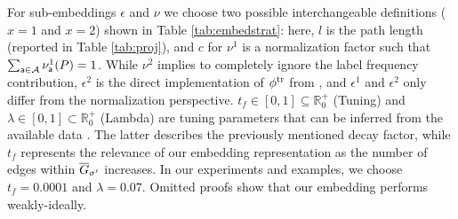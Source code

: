 {{%
\begin{table}[!t]
	\caption{Different sub-embedding definitions ($\epsilon^1$, $\epsilon^2$, $\nu^1$, and $\nu^2$) for $\gorgembed$.}\label{tab:embedstrat}
	\centering
\end{table}
%
For sub-embeddings $\epsilon$ and $\nu$  we choose two possible interchangeable definitions ($x=1$ and $x=2$) shown in Table \ref{tab:embedstrat}: here, $l$ is the path length (reported in Table \ref{tab:proj}), and $c$ for $\nu^1$ is a normalization factor such that $\sum_{\mathsf{a}\in\mathcal{A}}\nu^1_{\mathsf{a}}(P)=1$. While $\nu^2$ implies to completely ignore the label frequency contribution, $\epsilon^2$ is the direct implementation of ${\phi^{\text{tr}}}$ from \cite{LodhiSSCW02}, and $\epsilon^1$ and $\epsilon^2$ only differ from the normalization perspective. %
%
$t_f\in [0,1]\subseteq\mathbb{R}^+_{0}$ (\textsf{Tuning}) and $\lambda\in [0,1]\subset\mathbb{R}^+_{0}$ (\textsf{Lambda}) are tuning parameters that can be
inferred from the available data \cite{DriessensRG06}. The latter describes the previously mentioned decay factor, while $t_f$
represents the relevance of our embedding representation as the number of edges within $\overline{G}_{\sigma'}$ increases. In our experiments and
examples, we choose $t_f=0.0001$ and $\lambda=0.07$. Omitted proofs show that our embedding  performs weakly-ideally. 



}}
